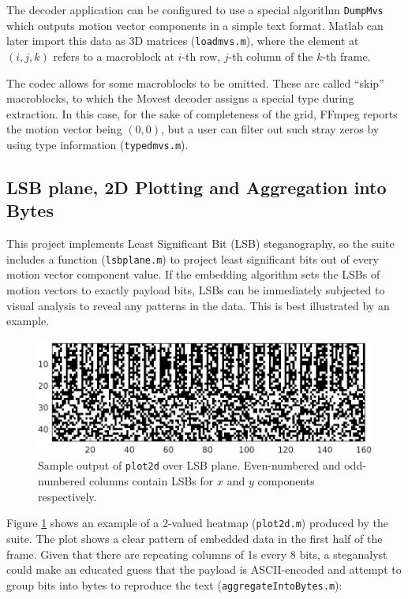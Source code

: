 \documentclass[12pt,british,twoside,notitlepage,usenames,dvipsnames,hypens,final]{report}
\numberwithin{equation}{section}
\numberwithin{figure}{section}
\begin{document}
The decoder application can be configured to use a special algorithm \texttt{DumpMvs} which outputs motion vector components in a simple text format. Matlab can later import this data as 3D matrices (\texttt{loadmvs.m}), where the element at $(i, j, k)$ refers to a macroblock at $i$-th row, $j$-th column of the $k$-th frame. 

The codec allows for some macroblocks to be omitted. These are called ``skip'' macroblocks, to which the Movest decoder assigns a special type during extraction. In this case, for the sake of completeness of the grid, FFmpeg reports the motion vector being $(0, 0)$, but a user can filter out such stray zeros by using type information (\texttt{typedmvs.m}).

\subsection{LSB plane, 2D Plotting and Aggregation into Bytes}

This project implements Least Significant Bit (LSB) steganography, so the suite includes a function (\texttt{lsbplane.m}) to project least significant bits out of every motion vector component value. If the embedding algorithm sets the LSBs of motion vectors to exactly payload bits, LSBs can be immediately subjected to visual analysis to reveal any patterns in the data. This is best illustrated by an example.

\begin{figure}[tbh]
\centerline{\includegraphics{img/unencrypted-enc.eps}}
\caption{Sample output of \texttt{plot2d} over LSB plane. Even-numbered and odd-numbered columns contain LSBs for $x$ and $y$ components respectively.}
\label{fig:unencrypted-enc}
\end{figure}

Figure \ref{fig:unencrypted-enc} shows an example of a 2-valued heatmap (\texttt{plot2d.m}) produced by the suite. The plot shows a clear pattern of embedded data in the first half of the frame. Given that there are repeating columns of 1s every 8 bits, a steganalyst could make an educated guess that the payload is ASCII-encoded and attempt to group bits into bytes to reproduce the text (\texttt{aggregateIntoBytes.m}):
\end{document}
